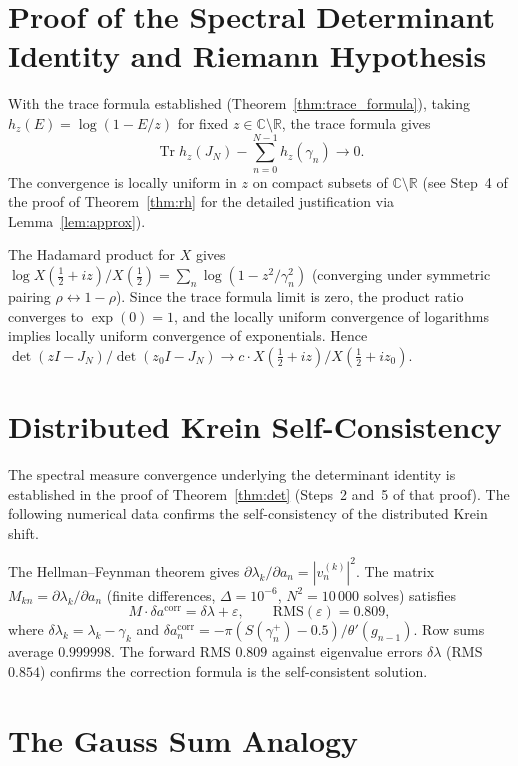 \documentclass{pre-aomart}
\def\xi{X}%
\theoremstyle{plain}
\theoremstyle{definition}
\theoremstyle{remark}
\begin{document}
\section{Proof of the Spectral Determinant Identity and Riemann Hypothesis}
\label{sec:trace_proof}

With the trace formula established (Theorem~\ref{thm:trace_formula}),
taking $h_z(E) = \log(1 - E/z)$ for fixed
$z \in \mathbb{C}\setminus\mathbb{R}$, the trace formula gives
\[
\operatorname{Tr} h_z(J_N) - \sum_{n=0}^{N-1} h_z(\gamma_n) \to 0.
\]
The convergence is locally uniform in $z$ on compact subsets of
$\mathbb{C}\setminus\mathbb{R}$
(see Step~4 of the proof of Theorem~\ref{thm:rh} for the detailed
justification via Lemma~\ref{lem:approx}).

The Hadamard product for $\xi$ gives
$\log \xi(\frac12 + iz)/\xi(\frac12) = \sum_n \log(1 - z^2/\gamma_n^2)$
(converging under symmetric pairing $\rho \leftrightarrow 1-\rho$).
Since the trace formula limit is zero, the product ratio converges to
$\exp(0) = 1$, and the locally uniform convergence of logarithms
implies locally uniform convergence of exponentials.
Hence $\det(z I - J_N)/\det(z_0 I - J_N)
\to c \cdot \xi(\frac12 + iz)/\xi(\frac12 + iz_0)$.

\section{Distributed Krein Self-Consistency}
\label{sec:krein}

The spectral measure convergence underlying the determinant identity is
established in the proof of Theorem~\ref{thm:det} (Steps~2 and~5 of that
proof).  The following numerical data confirms the self-consistency of the
distributed Krein shift.

The Hellman--Feynman theorem gives $\partial\lambda_k/\partial a_n = |v_n^{(k)}|^2$.
The matrix $M_{kn} = \partial\lambda_k/\partial a_n$ (finite differences,
$\Delta = 10^{-6}$, $N^2 = 10\,000$ solves) satisfies
\[
M \cdot \delta a^{\text{corr}} = \delta\lambda + \varepsilon,
\qquad \text{RMS}(\varepsilon) = 0.809,
\]
where $\delta\lambda_k = \lambda_k - \gamma_k$ and
$\delta a_n^{\text{corr}} = -\pi(S(\gamma_n^+) - 0.5)/\theta'(g_{n-1})$.
Row sums average $0.999998$.  The forward RMS $0.809$ against eigenvalue
errors $\delta\lambda$ (RMS $0.854$) confirms the correction formula is
the self-consistent solution.

\section{The Gauss Sum Analogy}
\label{sec:gauss}
\end{document}
